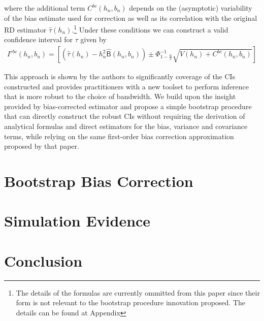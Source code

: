 \documentclass[12pt,fleqn]{article}
\begin{document}
where the additional term $C^{bc}(h_{n}, b_{n})$ depends on the (asymptotic) 
variability of the bias estimate used for correction as well as its correlation 
with the original RD estimator $\hat{\tau}(h_{n})$.\footnote{The details of the 
formulas are currently ommitted from this paper since their form is not relevant
to the bootstrap procedure innovation proposed. The details can be found at 
\cite{calonico2014} Appendix}  Under these conditions we can construct a valid 
confidence interval for $\tau$ given by
 \begin{align}
  I^{rbc}(h_{n}, b_{n})=\left[\left(\hat{\tau}(h_{n})-h_{n}^{2}\hat{\mathsf{B}}
  (h_{n},b_{n})\right)\pm \Phi^{-1}_{1-\frac{\alpha}{2}}\sqrt{V(h_{n})+C^{bc}
  (h_{n}, b_{n})} \right]
 \end{align}

This approach is shown by the authors to significantly coverage of the CIs 
constructed and provides practitioners with a new toolset to perform inference 
that is more robust to the choice of bandwidth. We build upon the insight 
provided by \cite{calonico2014} bias-corrected estimator and propose a simple 
bootstrap procedure that can directly construct the robust CIs without requiring
the derivation of analytical formulas and direct estimators for the bias, 
variance and covariance terms, while relying on the same first-order bias 
correction approximation proposed by that paper.

\section{Bootstrap Bias Correction}\label{boot}

\section{Simulation Evidence}\label{sim}

\section{Conclusion}\label{conclusion}
\end{document}
